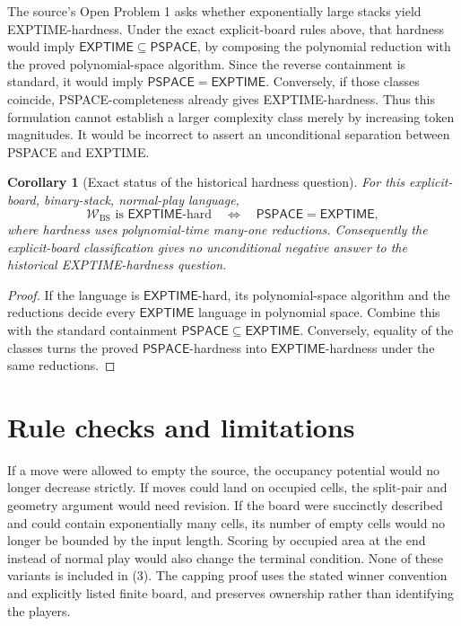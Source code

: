 \documentclass[11pt]{article}
\newtheorem{corollary}{Corollary}
\begin{document}
The source's Open Problem 1 asks whether exponentially large stacks yield
EXPTIME-hardness. Under the exact explicit-board rules above, that
hardness would imply $\mathsf{EXPTIME}\subseteq\mathsf{PSPACE}$, by
composing the polynomial reduction with the proved polynomial-space
algorithm. Since the reverse containment is standard, it would imply
$\mathsf{PSPACE}=\mathsf{EXPTIME}$. Conversely, if those classes coincide,
PSPACE-completeness already gives EXPTIME-hardness. Thus this formulation
cannot establish a larger complexity class merely by increasing token
magnitudes. It would be incorrect to assert an unconditional separation
between PSPACE and EXPTIME.

\begin{corollary}[Exact status of the historical hardness question]
For this explicit-board, binary-stack, normal-play language,
\[
 \mathcal W_{\mathrm{BS}}\text{ is }\mathsf{EXPTIME}\text{-hard}
 \quad\Longleftrightarrow\quad
 \mathsf{PSPACE}=\mathsf{EXPTIME},
\]
where hardness uses polynomial-time many-one reductions. Consequently
the explicit-board classification gives no unconditional negative answer
to the historical EXPTIME-hardness question.
\end{corollary}
\begin{proof}
If the language is $\mathsf{EXPTIME}$-hard, its polynomial-space algorithm
and the reductions decide every $\mathsf{EXPTIME}$ language in polynomial
space. Combine this with the standard containment
$\mathsf{PSPACE}\subseteq\mathsf{EXPTIME}$. Conversely, equality of the
classes turns the proved $\mathsf{PSPACE}$-hardness into
$\mathsf{EXPTIME}$-hardness under the same reductions.
\end{proof}

\section*{Rule checks and limitations}
If a move were allowed to empty the source, the occupancy potential would
no longer decrease strictly. If moves could land on occupied cells, the
split-pair and geometry argument would need revision. If the board were
succinctly described and could contain exponentially many cells, its
number of empty cells would no longer be bounded by the input length.
Scoring by occupied area at the end instead of normal play would also
change the terminal condition. None of these variants is included in (3).
The capping proof uses the stated winner convention and explicitly listed
finite board, and preserves ownership rather than identifying the players.
\end{document}
